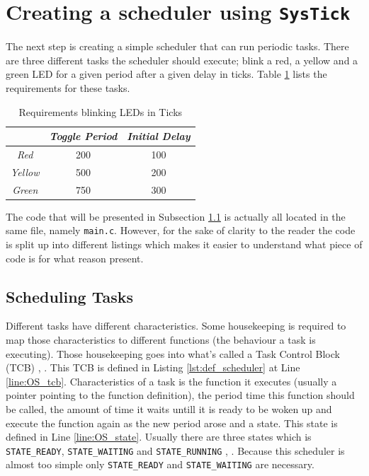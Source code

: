 \section{Creating a scheduler using \texttt{SysTick} }
The next step is creating a simple scheduler that can run periodic tasks. There are three different tasks the scheduler
should execute; blink a red, a yellow and a green LED for a given period after a 
given delay in ticks. Table \ref{tab:led_schedule} lists the requirements for these tasks.

\begin{table}[H]
    \centering
    \begin{tabular}{|c|c|c|}
        \hline
         & \textcolor{darkpink}{\textit{Toggle Period}} & \textcolor{darkpink}{\textit{Initial Delay}}\\
        \hline
        \textit{Red} & 200 & 100 \\
        \hline
        \textit{Yellow} & 500 & 200 \\
        \hline
        \textit{Green} & 750 & 300 \\
        \hline
    \end{tabular}
        
    \label{tab:led_schedule}
    \caption{Requirements blinking LEDs in Ticks}
\end{table}

The code that will be presented in Subsection \ref{subsec:schedule_task} is actually all located in the same file, namely \texttt{main.c}.
However, for the sake of clarity to the reader the code is split up into different listings which makes it easier to understand what piece of code is for what reason present.

\subsection{Scheduling Tasks}
\label{subsec:schedule_task}

Different tasks have different characteristics. Some housekeeping is required to map those characteristics to different functions (the behaviour a task is executing).
Those housekeeping goes into what's called a Task Control Block (TCB) \cite{SROS}, \cite{usosii}.
This TCB is defined in Listing \ref{lst:def_scheduler} at Line \ref{line:OS_tcb}.
Characteristics of a task is the function it executes (usually a pointer pointing to the function definition), the period time this function should be called, the amount of time it waits untill it is ready to be woken up and execute the function again as the new period arose and a state.
This state is defined in Line \ref{line:OS_state}.
Usually there are three states which is \texttt{STATE\_READY}, \texttt{STATE\_WAITING} and \texttt{STATE\_RUNNING} \cite{SROS}, \cite{usosii}.
Because this scheduler is almost too simple only \texttt{STATE\_READY} and \texttt{STATE\_WAITING} are necessary.

